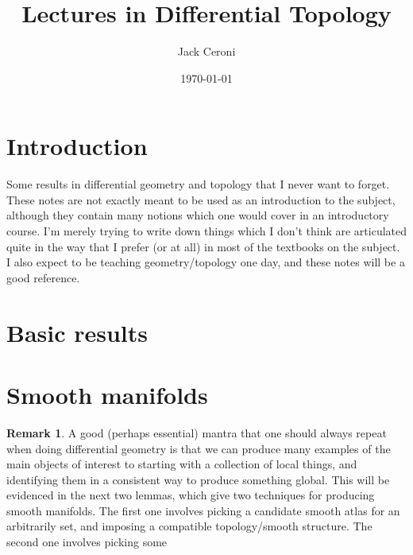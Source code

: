 \documentclass[aps,pra,showpacs,notitlepage,onecolumn,superscriptaddress,nofootinbib]{revtex4-1}
\theoremstyle{definition}
\newtheorem{remark}{Remark}[section]
\begin{document}
\title{Lectures in Differential Topology}
\author{Jack Ceroni}
\date{\today}
\maketitle

\tableofcontents

\section{Introduction}

\noindent Some results in differential geometry and topology that I never want to forget. These notes are not exactly meant to be used as an introduction to the subject, although
they contain many notions which one would cover in an introductory course. I'm merely trying to write down things which I don't think are articulated quite in the way that I prefer (or at all)
in most of the textbooks on the subject. I also expect to be teaching geometry/topology one day, and these notes will be a good reference.

\section{Basic results}

\section{Smooth manifolds}

\begin{remark}
  A good (perhaps essential) mantra that one should always repeat when doing differential geometry is that we can produce many examples of the main objects of interest
  to starting with a collection of local things, and identifying them in a consistent way to produce something global. This will be evidenced in the next two lemmas, which
  give two techniques for producing smooth manifolds. The first one involves picking a candidate smooth atlas for an arbitrarily set, and imposing a compatible topology/smooth structure.
  The second one involves picking some 
\end{remark}
\end{document}
